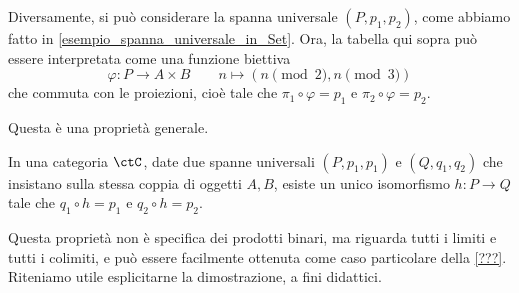 Diversamente, si può considerare la spanna universale \((P,p_1,p_2)\), come abbiamo fatto in \ref{esempio_spanna_universale_in_Set}. Ora, la tabella qui sopra può essere interpretata come una funzione biettiva
\[
	\varphi\colon P\to A\times B \qquad n\mapsto (n\pmod2,n\pmod3)
\]
che commuta con le proiezioni, cioè  tale che \(\pi_1\circ\varphi=p_1\) e \(\pi_2\circ\varphi=p_2\).

Questa è una proprietà generale.

\begin{proposition}
	In una categoria \(\ctC\), date due spanne universali \((P,p_1,p_1)\) e \((Q,q_1,q_2)\) che insistano sulla stessa coppia di oggetti \(A,B\), esiste un unico isomorfismo \(h\colon P\to Q\) tale che \(q_1\circ h=p_1\) e \(q_2\circ h=p_2\).
\end{proposition}
Questa proprietà non è specifica dei prodotti binari, ma riguarda tutti i limiti e tutti i colimiti, e può essere facilmente ottenuta come caso particolare della \ref{???}. Riteniamo utile esplicitarne la dimostrazione, a fini didattici.
